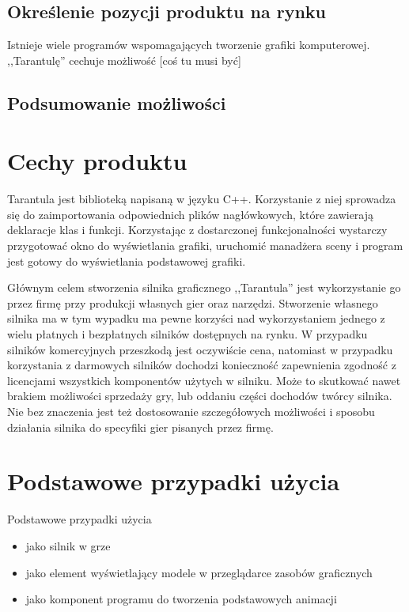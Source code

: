 \documentclass[11pt,leqno]{article}
\begin{document}
\subsection{Określenie pozycji produktu na rynku}
Istnieje wiele programów wspomagających tworzenie grafiki komputerowej. ,,Tarantulę'' cechuje możliwość [coś tu musi być]

\subsection{Podsumowanie możliwości}


\section{Cechy produktu}

Tarantula jest biblioteką napisaną w języku C++. Korzystanie z niej sprowadza się do zaimportowania odpowiednich plików nagłówkowych, 
które zawierają deklaracje klas i funkcji. Korzystając z dostarczonej funkcjonalności wystarczy przygotować okno do wyświetlania grafiki, 
uruchomić manadżera sceny i program jest gotowy do wyświetlania podstawowej grafiki.


Głównym celem stworzenia silnika graficznego ,,Tarantula'' jest wykorzystanie go przez firmę przy produkcji własnych gier oraz narzędzi. 
Stworzenie własnego silnika ma w tym wypadku ma pewne korzyści nad wykorzystaniem jednego z wielu płatnych i bezpłatnych silników 
dostępnych na rynku. W przypadku silników komercyjnych przeszkodą jest oczywiście cena, natomiast w przypadku korzystania z darmowych 
silników dochodzi konieczność zapewnienia zgodność z licencjami wszystkich komponentów użytych w silniku. Może to skutkować nawet 
brakiem możliwości sprzedaży gry, lub oddaniu części dochodów twórcy silnika. Nie bez znaczenia jest też dostosowanie szczegółowych 
możliwości i sposobu działania silnika do specyfiki gier pisanych przez firmę.

\section{Podstawowe przypadki użycia}
Podstawowe przypadki użycia
\begin{itemize}
\item jako silnik w grze
\item jako element wyświetlający modele w przeglądarce zasobów graficznych
\item jako komponent programu do tworzenia podstawowych animacji
\end{itemize}
\end{document}
